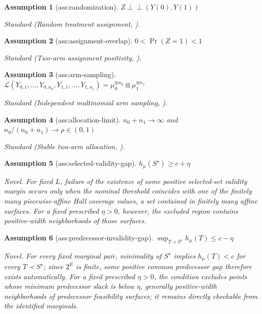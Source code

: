 \documentclass{article}
\newtheorem{assumption}{Assumption}
\begin{document}
\begin{assumption}[ass:randomization]\label{ass:randomization}
\(Z\perp\!\!\!\perp(Y(0),Y(1))\)
\par\smallskip\noindent\emph{Standard} (Random treatment assignment, \cite{ZhangRichardson2025}).
\end{assumption}

\begin{assumption}[ass:assignment-overlap]\label{ass:assignment-overlap}
\(0<\Pr(Z=1)<1\)
\par\smallskip\noindent\emph{Standard} (Two-arm assignment positivity, \cite{ZhangRichardson2025}).
\end{assumption}

\begin{assumption}[ass:arm-sampling]\label{ass:arm-sampling}
\(\mathcal L(Y_{0,1},\ldots,Y_{0,n_0},Y_{1,1},\ldots,Y_{1,n_1})=\mu_0^{\otimes n_0}\otimes\mu_1^{\otimes n_1}\)
\par\smallskip\noindent\emph{Standard} (Independent multinomial arm sampling, \cite{MalloyTripathyNowak2021}).
\end{assumption}

\begin{assumption}[ass:allocation-limit]\label{ass:allocation-limit}
\(n_0+n_1\to\infty\) and \(n_0/(n_0+n_1)\to\rho\in(0,1)\)
\par\smallskip\noindent\emph{Standard} (Stable two-arm allocation, \cite{HuangFangHanleyRosenblum2019}).
\end{assumption}

\begin{assumption}[ass:selected-validity-gap]\label{ass:selected-validity-gap}
\(h_{\mu}(S^\star)\geq c+\eta\)
\par\smallskip\noindent\emph{Novel.} For fixed \(L\), failure of the existence of some positive selected-set validity margin occurs only when the nominal threshold coincides with one of the finitely many piecewise-affine Hall coverage values, a set contained in finitely many affine surfaces. For a fixed prescribed \(\eta>0\), however, the excluded region contains positive-width neighborhoods of those surfaces.
\end{assumption}

\begin{assumption}[ass:predecessor-invalidity-gap]\label{ass:predecessor-invalidity-gap}
\(\sup_{T\prec S^\star}h_{\mu}(T)\leq c-\eta\)
\par\smallskip\noindent\emph{Novel.} For every fixed marginal pair, minimality of \(S^\star\) implies \(h_{\mu}(T)<c\) for every \(T\prec S^\star\); since \(2^E\) is finite, some positive common predecessor gap therefore exists automatically. For a fixed prescribed \(\eta>0\), the condition excludes points whose minimum predecessor slack is below \(\eta\), generally positive-width neighborhoods of predecessor feasibility surfaces; it remains directly checkable from the identified marginals.
\end{assumption}
\end{document}
